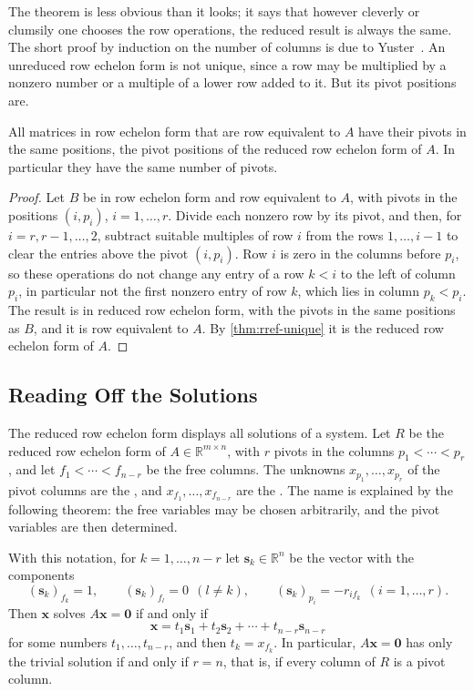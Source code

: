 The theorem is less obvious than it looks; it says that however cleverly or clumsily one chooses the row operations, the reduced result is always the same. The short proof by induction on the number of columns is due to Yuster~\cite{yuster1984}. An unreduced row echelon form is not unique, since a row may be multiplied by a nonzero number or a multiple of a lower row added to it. But its pivot positions are.

\begin{corollary}
\label{cor:pivot-positions}
All matrices in row echelon form that are row equivalent to $A$ have their pivots in the same positions, the pivot positions of the reduced row echelon form of $A$. In particular they have the same number of pivots.
\end{corollary}

\begin{proof}
Let $B$ be in row echelon form and row equivalent to $A$, with pivots in the positions $(i,p_i)$, $i=1,\ldots,r$. Divide each nonzero row by its pivot, and then, for $i=r,r-1,\ldots,2$, subtract suitable multiples of row $i$ from the rows $1,\ldots,i-1$ to clear the entries above the pivot $(i,p_i)$. Row $i$ is zero in the columns before $p_i$, so these operations do not change any entry of a row $k<i$ to the left of column $p_i$, in particular not the first nonzero entry of row $k$, which lies in column $p_k<p_i$. The result is in reduced row echelon form, with the pivots in the same positions as $B$, and it is row equivalent to $A$. By \cref{thm:rref-unique} it is the reduced row echelon form of $A$.
\end{proof}

\subsection{Reading Off the Solutions}

The reduced row echelon form displays all solutions of a system. Let $R$ be the reduced row echelon form of $A\in\mathbb R^{m\times n}$, with $r$ pivots in the columns $p_1<\cdots<p_r$, and let $f_1<\cdots<f_{n-r}$ be the free columns. The unknowns $x_{p_1},\ldots,x_{p_r}$ of the pivot columns are the , and $x_{f_1},\ldots,x_{f_{n-r}}$ are the . The name is explained by the following theorem: the free variables may be chosen arbitrarily, and the pivot variables are then determined.

\begin{theorem}
\label{thm:homogeneous-solutions}
With this notation, for $k=1,\ldots,n-r$ let $\mathbf s_k\in\mathbb R^n$ be the vector with the components
\[
(\mathbf s_k)_{f_k}=1,\qquad(\mathbf s_k)_{f_l}=0\ \ (l\ne k),\qquad(\mathbf s_k)_{p_i}=-r_{i f_k}\ \ (i=1,\ldots,r).
\]
Then $\mathbf x$ solves $A\mathbf x=\mathbf 0$ if and only if
\[
\mathbf x=t_1\mathbf s_1+t_2\mathbf s_2+\cdots+t_{n-r}\mathbf s_{n-r}
\]
for some numbers $t_1,\ldots,t_{n-r}$, and then $t_k=x_{f_k}$. In particular, $A\mathbf x=\mathbf 0$ has only the trivial solution if and only if $r=n$, that is, if every column of $R$ is a pivot column.
\end{theorem}

